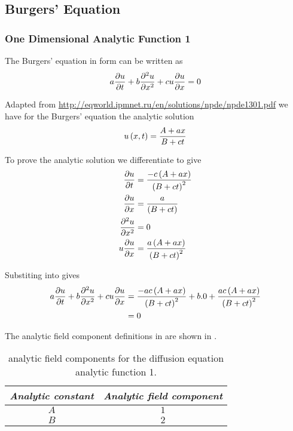 \subsection{Burgers' Equation} 

\subsubsection{One Dimensional Analytic Function 1}

The \oned Burgers' equation in \OpenCMISS form can be written as
\begin{equation}
  a \dfrac{\partial u}{\partial t} +b \dfrac{\partial^{2} u}{\partial {x}^{2}} +cu \dfrac{\partial u}{\partial x} =0
  \label{eqn:OpenCMISSBurgerEquationOneDim}
\end{equation}

Adapted from \url{http://eqworld.ipmnet.ru/en/solutions/npde/npde1301.pdf} we
have for the \oned Burgers' equation the analytic solution
\begin{equation}
   u\left( x,t \right) =\dfrac{A+ax}{B+ct}
  \label{eqn:AnalyticBurgersEquationOneDim1}
\end{equation}

To prove the analytic solution we differentiate  to give
\begin{align}
   \dfrac{\partial u}{\partial t}  &= \dfrac{-c\left( A+ax \right)}{\left( B+ct \right)^{2}} \\
   \dfrac{\partial u}{\partial x}  &= \dfrac{a}{\left( B+ct \right)} \\
   \dfrac{\partial^{2} u}{\partial {x}^{2}}  &= 0 \\
  u \dfrac{\partial u}{\partial x}  &= \dfrac{a\left( A+ax \right)}{\left( B+ct \right)^{2}} \\
  \label{eqn:AnalyticBurgersEquationOneDim1Derivatives}
\end{align}

Substiting  into  gives
\begin{align}
  a \dfrac{\partial u}{\partial t} +b \dfrac{\partial^{2} u}{\partial {x}^{2}} +cu \dfrac{\partial u}{\partial x}  &=
  \dfrac{-ac\left( A+ax \right)}{\left( B+ct \right)^{2}}+b.0+\dfrac{ac\left( A+ax \right)}{\left( B+ct \right)^{2}}\\
  &= 0
\end{align}

The analytic field component definitions in \OpenCMISS are shown in .

\begin{table}[htb] \centering
  \begin{tabular}{|c|c|} \hline
    \emph{Analytic constant} & \emph{Analytic field component} \\ \hline \hline
    $A$ & $1$ \\ 
    $B$ & $2$ \\  \hline
  \end{tabular}
  \caption{\OpenCMISS analytic field components for the \oned diffusion equation
    analytic function 1.}
  \label{tab:OpenCMISSAnalyticFieldBurgersEquationOneDim1}
\end{table}

